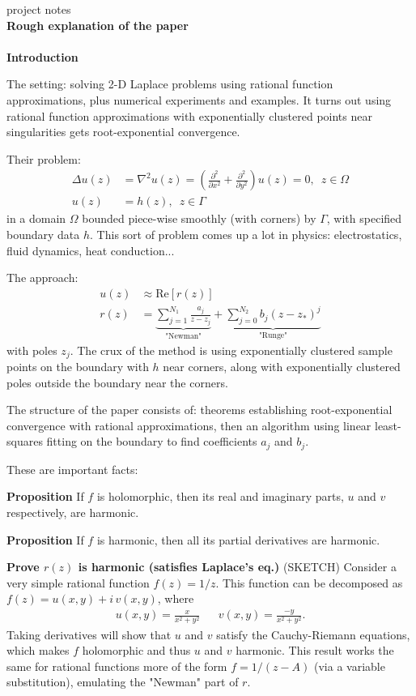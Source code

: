 \documentclass[12]{article}
\begin{document}
  project notes\\
\large
\textbf{Rough explanation of the paper}\\ \\ \normalsize
\textbf{Introduction}

	The setting: solving 2-D Laplace problems using rational function approximations, plus numerical experiments and examples.
	It turns out using rational function approximations with exponentially clustered points near singularities gets root-exponential convergence.
	
	Their problem:
	\begin{align*}
	\Delta u(z) &= \nabla^2 u(z) = \left( \frac{\partial^2}{\partial x^2} + \frac{\partial^2}{\partial y^2}\right)u(z) = 0,\enspace z\in \Omega \\ 		u(z)&=h(z),\enspace z\in \Gamma
	\end{align*}
in a domain $\Omega$ bounded piece-wise smoothly (with corners) by $\Gamma$, with specified boundary data $h$. This sort of problem comes up a lot in physics: electrostatics, fluid dynamics, heat conduction...
	
	The approach:
	\begin{align*}
	u(z)&\approx \mathrm{Re}[r(z)] \\
	r(z) &= \underbrace{\sum_{j=1}^{N_1} \frac{a_j}{z-z_j}}_\text{"Newman"} + \underbrace{\sum_{j=0}^{N_2} b_j (z-z_*)^j}_\text{"Runge"}
	\end{align*}
with poles ${z_j}$. The crux of the method is using exponentially clustered sample points on the boundary with $h$ near corners, along with exponentially clustered poles outside the boundary near the corners.
	
	The structure of the paper consists of: theorems establishing root-exponential convergence with rational approximations, then an algorithm using linear least-squares fitting on the boundary to find coefficients $a_j$ and $b_j$. 
	
	These are important facts:
	
	\textbf{Proposition} If $f$ is holomorphic, then its real and imaginary parts, $u$ and $v$ respectively, are harmonic. 
	
	\textbf{Proposition} If $f$ is harmonic, then all its partial derivatives are harmonic.
	
	\textbf{Prove $r(z)$ is harmonic (satisfies Laplace's eq.)} (SKETCH) Consider a very simple rational function $f(z)=1/z$. This function can be decomposed as $f(z)=u(x,y)+i\,v(x,y)$, where
	\begin{align*}
	u(x,y)=\frac{x}{x^2+y^2} &&
	v(x,y)=\frac{-y}{x^2+y^2}.
	\end{align*}
Taking derivatives will show that $u$ and $v$ satisfy the Cauchy-Riemann equations, which makes $f$ holomorphic and thus $u$ and $v$ harmonic. This result works the same for rational functions more of the form $f=1/(z-A)$ (via a variable substitution), emulating the "Newman" part of $r$. 
\end{document}
